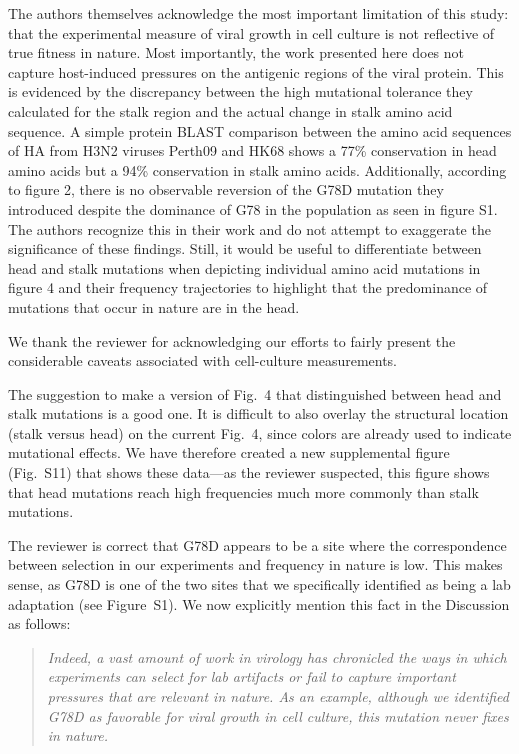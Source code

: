 \documentclass[11pt, oneside]{article}   	%
\newcommand{\response}[1]{{\color{black}#1}}
\begin{document}
The authors themselves acknowledge the most important limitation of this study: that the experimental measure of viral growth in cell culture is not reflective of true fitness in nature. Most importantly, the work presented here does not capture host-induced pressures on the antigenic regions of the viral protein. This is evidenced by the discrepancy between the high mutational tolerance they calculated for the stalk region and the actual change in stalk amino acid sequence. A simple protein BLAST comparison between the amino acid sequences of HA from H3N2 viruses Perth09 and HK68 shows a 77\% conservation in head amino acids but a 94\% conservation in stalk amino acids. Additionally, according to figure 2, there is no observable reversion of the G78D mutation they introduced despite the dominance of G78 in the population as seen in figure S1. The authors recognize this in their work and do not attempt to exaggerate the significance of these findings. Still, it would be useful to differentiate between head and stalk mutations when depicting individual amino acid mutations in figure 4 and their frequency trajectories to highlight that the predominance of mutations that occur in nature are in the head. 

\response{We thank the reviewer for acknowledging our efforts to fairly present the considerable caveats associated with cell-culture measurements.

The suggestion to make a version of Fig.~4 that distinguished between head and stalk mutations is a good one.
It is difficult to also overlay the structural location (stalk versus head) on the current Fig.~4, since colors are already used to indicate mutational effects.
We have therefore created a new supplemental figure (Fig.~S11) that shows these data---as the reviewer suspected, this figure shows that head mutations reach high frequencies much more commonly than stalk mutations.

The reviewer is correct that G78D appears to be a site where the correspondence between selection in our experiments and frequency in nature is low.
This makes sense, as G78D is one of the two sites that we specifically identified as being a lab adaptation (see Figure~S1).
We now explicitly mention this fact in the Discussion as follows:

\begin{quote}
\textsl{Indeed, a vast amount of work in virology has chronicled the ways in which experiments can select for lab artifacts or fail to capture important pressures that are relevant in nature.
As an example, although we identified G78D as favorable for viral growth in cell culture, this mutation never fixes in nature. }
\end{quote}
} 
\end{document}
